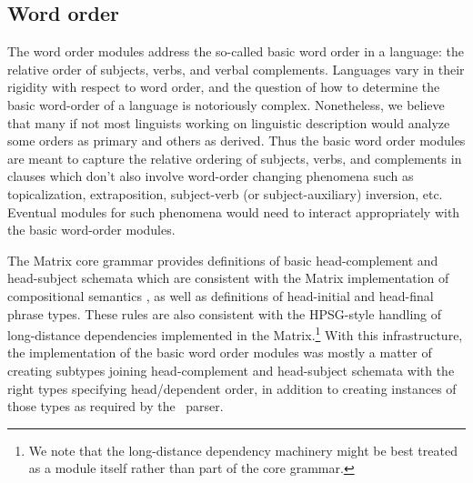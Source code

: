 \subsection{Word order}

The word order modules address the so-called basic word order in
a language: the relative order of subjects, verbs, and verbal complements.
Languages vary in their rigidity with respect to word order, and the
question of how to determine the basic word-order of a language is 
notoriously complex.  Nonetheless, we believe that many if not most
linguists working on linguistic description would analyze some orders
as primary and others as derived.  Thus the basic word order modules
are meant to capture the relative ordering of subjects, verbs, and complements
in clauses which don't also involve word-order changing phenomena
such as topicalization, extraposition, subject-verb (or subject-auxiliary)
inversion, etc.  Eventual modules for such phenomena would need to
interact appropriately with the basic word-order modules.

The Matrix core grammar provides definitions of basic
head-complement and head-subject schemata which are consistent with
the Matrix implementation of compositional semantics
\cite{Fli:Ben:03}, as well as definitions of head-initial and
head-final phrase types.  These rules are also consistent with the
HPSG-style handling of long-distance dependencies implemented in the
Matrix.\footnote{We note that the long-distance dependency machinery
might be best treated as a module itself rather than part of the core
grammar.}  With this infrastructure, the implementation of the basic
word order modules was mostly a matter of creating subtypes joining
head-complement and head-subject schemata with the right types
specifying head/dependent order, in addition to creating instances of
those types as required by the \lkb\ parser.

